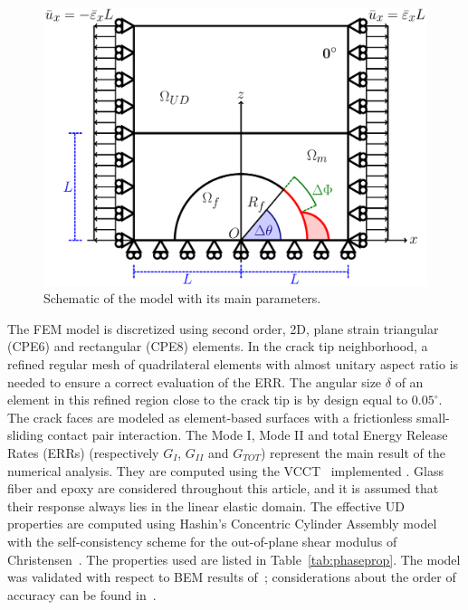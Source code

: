 \documentclass[Review,sagev,times]{sagej}
\begin{document}
\begin{figure}[!htb]
\centering
        \includegraphics[height=0.375\textheight]{RUC.pdf}
\caption{Schematic of the model with its main parameters.}\label{fig:modelschem}
\end{figure}

The FEM model is discretized using second order, 2D, plane strain triangular (CPE6) and rectangular (CPE8) elements. In the crack tip neighborhood, a refined regular mesh of quadrilateral elements with almost unitary aspect ratio is needed to ensure a correct evaluation of the ERR. The angular size $\delta$ of an element in this refined region close to the crack tip is by design equal to $0.05^{\circ}$. The crack faces are modeled as element-based surfaces with a frictionless small-sliding contact pair interaction. The Mode I, Mode II and total Energy Release Rates (ERRs) (respectively $G_{I}$, $G_{II}$ and $G_{TOT}$) represent the main result of the numerical analysis. They are computed using the VCCT~\cite{Krueger2004} implemented . Glass fiber and epoxy are considered throughout this article, and it is assumed that their response always lies in the linear elastic domain. The effective UD properties are computed using Hashin's Concentric Cylinder Assembly model~\cite{Hashin1983} with the self-consistency scheme for the out-of-plane shear modulus of Christensen~\cite{Christensen1979}. The properties used are listed in Table~\ref{tab:phaseprop}. The model was validated with respect to BEM results of~\cite{Paris2007,Sandino2016}; considerations about the order of accuracy can be found in~\cite{DiStasio2019}.
\end{document}
